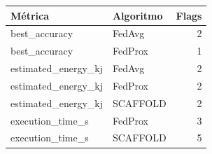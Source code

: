 \begin{tabular}{llr}
\toprule
Métrica & Algoritmo & Flags \\
\midrule
best_accuracy & FedAvg & 2 \\
best_accuracy & FedProx & 1 \\
estimated_energy_kj & FedAvg & 2 \\
estimated_energy_kj & FedProx & 2 \\
estimated_energy_kj & SCAFFOLD & 2 \\
execution_time_s & FedProx & 3 \\
execution_time_s & SCAFFOLD & 5 \\
\bottomrule
\end{tabular}
